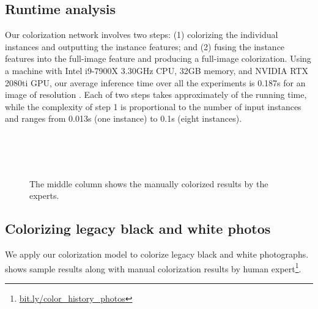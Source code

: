 \subsection{Runtime analysis}
Our colorization network involves two steps: 
(1) colorizing the individual instances and outputting the instance features; and 
(2) fusing the instance features into the full-image feature and producing a full-image colorization.
Using a machine with Intel i9-7900X 3.30GHz CPU, 32GB memory, and NVIDIA RTX 2080ti GPU, our average inference time over all the experiments is 0.187s for an image of resolution .
Each of two steps takes approximately  of the running time, while the complexity of step 1 is proportional to the number of input instances and ranges from 0.013s (one instance) to 0.1s (eight instances).

\begin{figure}[!b]
     \hfill
     \hfill
    \\
     \hfill
     \hfill
    \\
     \hfill
     \hfill
    \\
     \hfill
     \hfill
    
    \caption{ 
    The middle column shows the manually colorized results by the experts.}
    \label{fig:legacy}
\end{figure} 
\subsection{Colorizing legacy black and white photos}
\label{sec:legacy}
We apply our colorization model to colorize legacy black and white photographs. 
 shows sample results along with manual colorization results by human expert\footnote{\url{bit.ly/color_history_photos}}.




